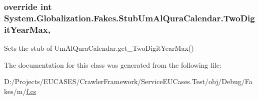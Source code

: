 \hypertarget{class_system_1_1_globalization_1_1_fakes_1_1_stub_um_al_qura_calendar_a23dc9beb4cac8171f2ba886fdebaa9b6}{
\subsubsection[{Two\-Digit\-Year\-Max}]{\setlength{\rightskip}{0pt plus 5cm}override int System.\-Globalization.\-Fakes.\-Stub\-Um\-Al\-Qura\-Calendar.\-Two\-Digit\-Year\-Max\hspace{0.3cm}{\ttfamily [get]}, {\ttfamily [set]}}}\label{class_system_1_1_globalization_1_1_fakes_1_1_stub_um_al_qura_calendar_a23dc9beb4cac8171f2ba886fdebaa9b6}


Sets the stub of Um\-Al\-Qura\-Calendar.\-get\-\_\-\-Two\-Digit\-Year\-Max()



The documentation for this class was generated from the following file\-:\begin{DoxyCompactItemize}
\item 
D\-:/\-Projects/\-E\-U\-C\-A\-S\-E\-S/\-Crawler\-Framework/\-Service\-E\-U\-Cases.\-Test/obj/\-Debug/\-Fakes/m/\hyperlink{m_2f_8cs}{f.\-cs}\end{DoxyCompactItemize}
